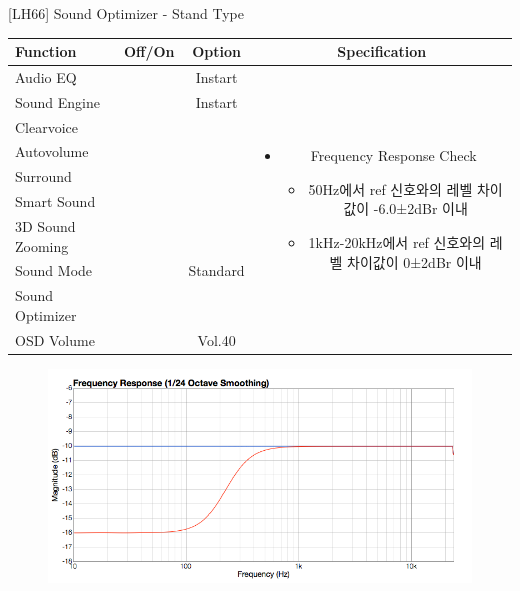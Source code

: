 \begin{frame}[t]{[LH66] Sound Optimizer - Stand Type}
\begin{tiny}
\begin{tabular}{@{}lccc@{}}
\toprule
Function & Off/On & Option & Specification \\
\midrule
Audio EQ & \color{black}{Off} & Instart &
\multirow{10}{60mm}{
\begin{itemize}
\item Frequency Response Check
	\begin{itemize}
	\item 50Hz에서 ref 신호와의 레벨 차이값이 -6.0±2dBr 이내
	\item 1kHz-20kHz에서 ref 신호와의 레벨 차이값이 0±2dBr 이내
	\end{itemize}
\end{itemize}
} \\
Sound Engine & \color{blue}{On} & Instart & \\
Clearvoice & \color{black}{Off} & & \\
Autovolume & \color{black}{Off} & & \\
Surround & \color{black}{Off} & & \\
Smart Sound & \color{black}{Off} & & \\
3D Sound Zooming & \color{black}{Off} & & \\
Sound Mode & \color{blue}{On} & Standard & \\
Sound Optimizer & \color{blue}{On} & \color{blue}{Standtype} & \\
OSD Volume & \color{blue}{On} & Vol.40 & \\
\midrule
\end{tabular}
\end{tiny}

\begin{figure}[b]
\includegraphics[height=0.4\textwidth]{figures/standtype.png}
\end{figure}

\end{frame}
